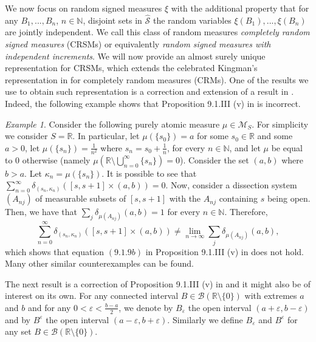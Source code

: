 \documentclass{article}
\theoremstyle{plain}
\theoremstyle{remark}
\newtheorem*{example}{Example}
\begin{document}
We now focus on random signed measures $\xi$ with the additional property that for any $B_1,...,B_n$, $n\in\mathbb{N}$, disjoint sets in $\hat{\mathcal{S}}$ the random variables $\xi(B_1),...,\xi(B_n)$ are jointly independent. We call this class of random measures \textit{completely random signed measures} (CRSMs) or equivalently \textit{random signed measures with independent increments}. We will now provide an almost surely unique representation for CRSMs, which extends the celebrated Kingman's representation in \citet{Kingman} for completely random measures (CRMs). One of the results we use to obtain such representation is a correction and extension of a result in \citet{Daley}. Indeed, the following example shows that Proposition 9.1.III (v) in \citet{Daley} is incorrect.
\begin{example}\label{counterexample}
	Consider the following purely atomic measure $\mu\in\mathcal{M}_S$. For simplicity we consider $S=\mathbb{R}$. In particular, let $\mu(\{s_0\})=a$ for some $s_0\in \mathbb{R}$ and some $a>0$, let  $\mu(\{s_n\})=\frac{1}{n^2}$ where $s_n=s_0+\frac{1}{n}$, for every $n\in\mathbb{N}$, and let $\mu$ be equal to 0 otherwise (namely $\mu(\mathbb{R}\setminus\bigcup_{n=0}^\infty\{s_n\})=0$). Consider the set $(a,b)$ where $b>a$. Let $\kappa_n=\mu(\{s_n\})$. It is possible to see that $\sum_{n=0}^\infty\delta_{(s_n,\kappa_n)}([s,s+1]\times(a,b))=0$. Now, consider a dissection system $(A_{nj})$ of measurable subsets of $[s,s+1]$ with the $A_{nj}$ containing $s$ being open. Then, we have that $\sum_{j}\delta_{\mu(A_{nj})}(a,b)=1$ for every $n\in\mathbb{N}$. Therefore, 
	\begin{equation*}
		\sum_{n=0}^\infty\delta_{(s_n,\kappa_n)}([s,s+1]\times(a,b))\neq\lim\limits_{n\to\infty} \sum_{j}\delta_{\mu(A_{nj})}(a,b),
	\end{equation*}
	which shows that equation $(9.1.9b)$ in Proposition 9.1.III (v) in \citet{Daley} does not hold. Many other similar counterexamples can be found.
\end{example}
The next result is a correction of Proposition 9.1.III (v) in \citet{Daley} and it might also be of interest on its own. For any connected interval $B\in  \mathcal{B} (\mathbb{R}\setminus\{0\})$ with extremes $a$ and $b$ and for any $0<\varepsilon<\frac{b-a}{2}$, we denote by $B_{\varepsilon}$ the open interval $(a+\varepsilon,b-\varepsilon)$ and by $B^{\varepsilon}$ the open interval $(a-\varepsilon,b+\varepsilon)$. Similarly we define $B_\varepsilon$ and $B^\varepsilon$ for any set $B\in  \mathcal{B} (\mathbb{R}\setminus\{0\})$.
\end{document}
